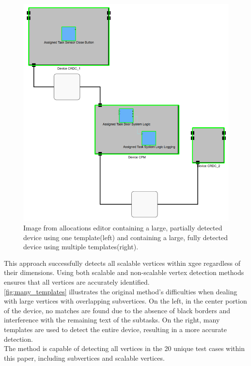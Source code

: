 \begin{figure}[htb]
\begin{minipage}[b]{0.36\textwidth}
        \includegraphics[width=\textwidth]{pictures/many_templates_after.png}
    \end{minipage}
    \caption[Complete detection of very large devices]{Image from allocations editor containing a large, partially detected device using one template(left) and containing a large, fully detected device using multiple templates(right).}
    \label{fig:many_templates}
\end{figure}
This approach successfully detects all scalable vertices within \acrshort{xgee} regardless of their dimensions. Using both scalable and non-scalable vertex detection methods ensures that all vertices are accurately identified.\\
\autoref{fig:many_templates} illustrates the original method's difficulties when dealing with large vertices with overlapping subvertices. On the left, in the center portion of the device, no matches are found due to the absence of black borders and interference with the remaining text of the subtasks. On the right, many templates are used to detect the entire device, resulting in a more accurate detection.\\
The method is capable of detecting all vertices in the 20 unique test cases within this paper, including subvertices and scalable vertices.


